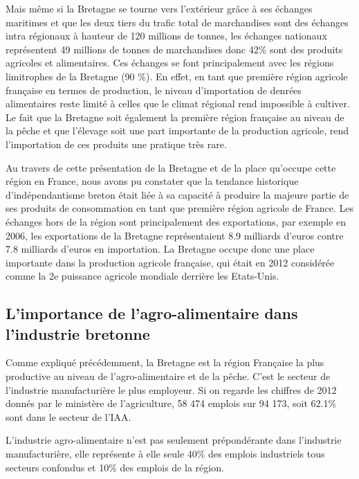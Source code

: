 \documentclass[a4paper,10pt]{report}
\begin{document}
			Mais même si la Bretagne se tourne vers l’extérieur grâce à ses échanges maritimes et que les deux tiers du trafic total de marchandises sont des échanges intra régionaux à hauteur de 120 millions de tonnes, les échanges nationaux représentent 49 millions de tonnes de marchandises donc 42\% sont des produits agricoles et alimentaires\cite{InfrastructureConnecterBretagneMondeCCI}. Ces échanges se font principalement avec les régions limitrophes de la Bretagne (90 \%). En effet, en tant que première région agricole française en termes de production, le niveau d’importation de denrées alimentaires reste limité à celles que le climat régional rend impossible à cultiver. Le fait que la Bretagne soit également la première région française au niveau de la pêche et que l’élevage soit une part importante de la production agricole, rend l’importation de ces produits une pratique très rare.
			
			Au travers de cette présentation de la Bretagne et de la place qu’occupe cette région en France, nous avons pu constater que la tendance historique d’indépendantisme breton était liée à sa capacité à produire la majeure partie de ses produits de consommation en tant que première région agricole de France. Les échanges hors de la région sont principalement des exportations, par exemple en 2006, les exportations de la Bretagne représentaient 8.9 milliards d’euros contre 7.8 milliards d’euros en importation. La Bretagne occupe donc une place importante dans la production agricole française, qui était en 2012 considérée comme la 2e puissance agricole mondiale derrière les Etats-Unis.
			
	
		\subsection{L'importance de l'agro-alimentaire dans l'industrie bretonne}
			Comme expliqué précédemment, la Bretagne est la région Française la plus productive au niveau de l’agro-alimentaire et de la pêche\cite{ChiffresCCI}. C’est le secteur de l’industrie manufacturière le plus employeur. Si on regarde les chiffres de 2012 donnés par le ministère de l’agriculture, 58 474 emplois sur 94 173, soit 62.1\% sont dans le secteur de l’IAA.
			
			L’industrie agro-alimentaire n’est pas seulement prépondérante dans l’industrie manufacturière, elle représente à elle seule 40\% des emplois industriels tous secteurs confondus et 10\% des emplois de la région\cite{OuEnEstIAABretonne}.
			
\end{document}
